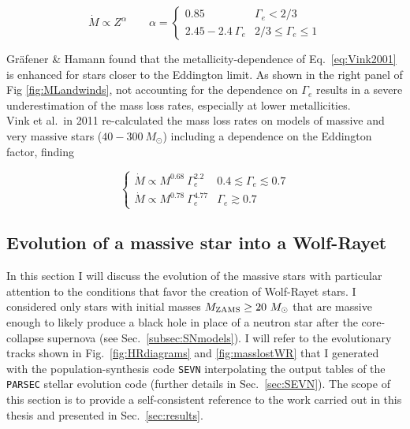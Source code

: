 \documentclass[a4paper,titlepage]{book}     	%
\newcommand{\sun}{\ensuremath{_\odot}}
\newcommand{\mzams}{M_\textup{ZAMS}}
\newcommand{\msun}{\ensuremath{M\sun}}
\begin{document}
\begin{equation}\label{eqn:WRwindGH2008}
\dot M \propto Z^{\alpha} \quad \quad  \alpha = 
\begin{cases}
0.85 & \Gamma_e < 2/3 \\
2.45-2.4~\Gamma_e & 2/3 \leq \Gamma_e \leq 1
\end{cases}
\end{equation}

Gr{\"a}fener \& Hamann found that the metallicity-dependence of Eq.\ \ref{eq:Vink2001} is enhanced for stars closer to the Eddington limit. As shown in the right panel of Fig \ref{fig:MLandwinds}, not accounting for the dependence on $\Gamma_e$ results in a severe underestimation of the mass loss rates, especially at lower metallicities.\\

Vink et al.\ in 2011 \cite{Vink2011} re-calculated the mass loss rates on models of massive and very massive stars ($40-300~\msun$) including a dependence on the Eddington factor, finding

\begin{equation}\label{eqn:Vink2011}
\begin{cases}
\dot M \propto M^{0.68}\ \Gamma_e^{2.2} & 0.4 \lesssim \Gamma_e \lesssim 0.7 \\
\dot M \propto M^{0.78}\ \Gamma_e^{4.77} & \Gamma_e \gtrsim 0.7
\end{cases}
\end{equation}






\subsection{Evolution of a massive star into a Wolf-Rayet}\label{subsec:stellarevo}

In this section I will discuss the evolution of the massive stars with particular attention to the conditions that favor the creation of Wolf-Rayet stars. I considered only stars with initial masses $\mzams \geq 20~\msun$ that are massive enough to likely produce a black hole in place of a neutron star after the core-collapse supernova (see Sec.\ \ref{subsec:SNmodels}). I will refer to the evolutionary tracks shown in Fig.\ \ref{fig:HRdiagrams} and \ref{fig:masslostWR} that I generated with the population-synthesis code \texttt{SEVN} \cite{spera2019_mergingBBH} interpolating the output tables of the \texttt{PARSEC} stellar evolution code \cite{parsec2015_chen} (further details in Sec.\ \ref{sec:SEVN}). The scope of this section is to provide a self-consistent reference to the work carried out in this thesis and presented in Sec.\ \ref{sec:results}. 
\end{document}
